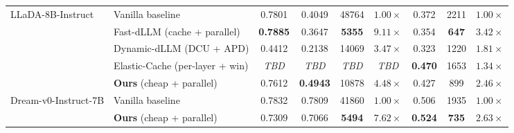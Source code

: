 \begin{table}[t]
\begin{tabular}{llccccccc}
\multirow{5}{*}{LLaDA-8B-Instruct}
 & Vanilla baseline                  & 0.7801 & 0.4049 & 48764 & $1.00\times$
                                                                  & 0.372         & 2211         & $1.00\times$ \\
 & Fast-dLLM (cache + parallel)      & \textbf{0.7885} & 0.3647 & \textbf{5355} & $\mathbf{9.11\times}$
                                                                  & 0.354         & \textbf{647} & $\mathbf{3.42\times}$ \\
 & Dynamic-dLLM (DCU + APD)          & 0.4412 & 0.2138 & 14069 & $3.47\times$
                                                                  & 0.323         & 1220         & $1.81\times$ \\
 & Elastic-Cache (per-layer + win)   & \textit{TBD} & \textit{TBD} & \textit{TBD} & \textit{TBD}
                                                                  & \textbf{0.470} & 1653         & $1.34\times$ \\
 & \textbf{Ours} (cheap + parallel)  & 0.7612 & \textbf{0.4943} & 10878 & $4.48\times$
                                                                  & 0.427         & 899          & $\mathbf{2.46\times}$ \\
\midrule
\multirow{2}{*}{Dream-v0-Instruct-7B}
 & Vanilla baseline                  & 0.7832 & 0.7809 & 41860 & $1.00\times$
                                                                  & 0.506 & 1935 & $1.00\times$ \\
 & \textbf{Ours} (cheap + parallel)  & 0.7309 & 0.7066 & \textbf{5494} & $\mathbf{7.62\times}$
                                                                  & \textbf{0.524} & \textbf{735} & $\mathbf{2.63\times}$ \\
\bottomrule
\end{tabular}
\end{table}


